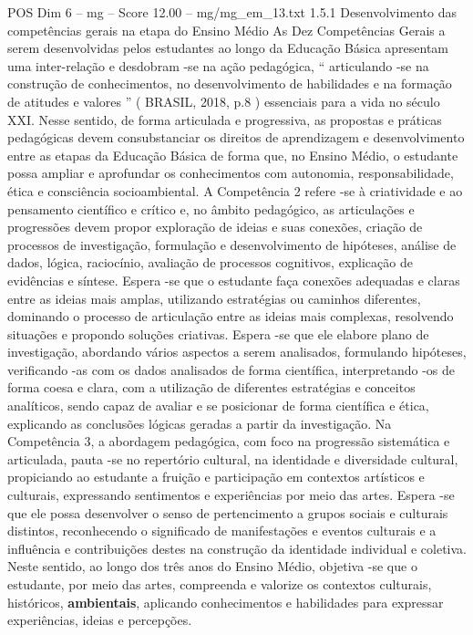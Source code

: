 \begin{textsample}{POS Dim 6 – mg – Score 12.00 – mg/mg\_em\_13.txt}  \label{ex:f6_pos_241}
1.5.1 Desenvolvimento das competências gerais na etapa do Ensino Médio As Dez Competências Gerais a serem desenvolvidas pelos estudantes ao longo da Educação Básica apresentam uma inter-relação e desdobram -se na ação pedagógica, “ articulando -se na construção de conhecimentos, no desenvolvimento de habilidades e na formação de atitudes e valores ” ( BRASIL, 2018, p.8 ) essenciais para a vida no século XXI.
Nesse sentido, de forma articulada e progressiva, as propostas e práticas pedagógicas devem consubstanciar os direitos de aprendizagem e desenvolvimento entre as etapas da Educação Básica de forma que, no Ensino Médio, o estudante possa ampliar e aprofundar os conhecimentos com autonomia, responsabilidade, ética e consciência socioambiental.
A Competência 2 refere -se à criatividade e ao pensamento científico e crítico e, no âmbito pedagógico, as articulações e progressões devem propor exploração de ideias e suas conexões, criação de processos de investigação, formulação e desenvolvimento de hipóteses, análise de dados, lógica, raciocínio, avaliação de processos cognitivos, explicação de evidências e síntese.
Espera -se que o estudante faça conexões adequadas e claras entre as ideias mais amplas, utilizando estratégias ou caminhos diferentes, dominando o processo de articulação entre as ideias mais complexas, resolvendo situações e propondo soluções criativas.
Espera -se que ele elabore plano de investigação, abordando vários aspectos a serem analisados, formulando hipóteses, verificando -as com os dados analisados de forma científica, interpretando -os de forma coesa e clara, com a utilização de diferentes estratégias e conceitos analíticos, sendo capaz de avaliar e se posicionar de forma científica e ética, explicando as conclusões lógicas geradas a partir da investigação.
Na Competência 3, a abordagem pedagógica, com foco na progressão sistemática e articulada, pauta -se no repertório cultural, na identidade e diversidade cultural, propiciando ao estudante a fruição e participação em contextos artísticos e culturais, expressando sentimentos e experiências por meio das artes.
Espera -se que ele possa desenvolver o senso de pertencimento a grupos sociais e culturais distintos, reconhecendo o significado de manifestações e eventos culturais e a influência e contribuições destes na construção da identidade individual e coletiva.
Neste sentido, ao longo dos três anos do Ensino Médio, objetiva -se que o estudante, por meio das artes, compreenda e valorize os contextos culturais, históricos, \textbf{ambientais}, aplicando conhecimentos e habilidades para expressar experiências, ideias e percepções.

\end{textsample}
